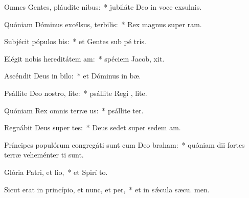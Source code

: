 \item Omnes Gentes, pláudite nibus:~* jubiláte Deo in voce exsulnis.
\item Quóniam Dóminus excélsus, terbilis:~* Rex magnus super  ram.
\item Subjécit pópulos bis:~* et Gentes sub pé tris.
\item Elégit nobis hereditátem am:~* spéciem Jacob,  xit.
\item Ascéndit Deus in bilo:~* et Dóminus in  bæ.
\item Psállite Deo nostro, lite:~* psállite Regi , lite.
\item Quóniam Rex omnis terræ us:~* psállite ter.
\item Regnábit Deus super tes:~* Deus sedet super sedem  am.
\item Príncipes populórum congregáti sunt cum Deo braham:~* quóniam dii fortes terræ veheménter ti sunt.
\item Glória Patri, et lio,~* et Spirí to.
\item Sicut erat in princípio, et nunc, et per,~* et in sǽcula sæcu. men.
